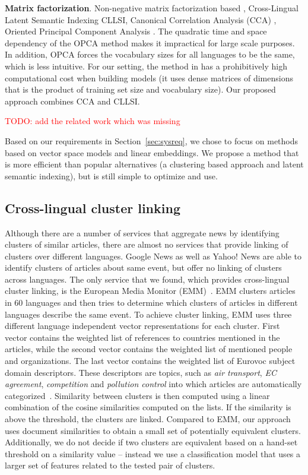 \documentclass[twoside,11pt]{article}
\newcommand{\todo}[1]{\textcolor{red}{TODO: #1}}
\begin{document}
\textbf{Matrix factorization}. Non-negative matrix factorization based \cite{nonnegfactor_lsi}, Cross-Lingual Latent Semantic Indexing CLLSI, Canonical Correlation Analysis (CCA) \cite{Hotelling}, Oriented Principal Component Analysis \cite{platt2010translingual}. The quadratic time and space dependency of the OPCA method makes it impractical for large scale purposes. In addition, OPCA forces the vocabulary sizes for all languages to be the same, which is less intuitive. For our setting, the method in \cite{nonnegfactor_lsi} has a prohibitively high computational cost when building models (it uses dense matrices of dimensions that is the product of training set size and vocabulary size). Our proposed approach combines CCA and CLLSI.

\todo{add the related work which was missing}

Based on our requirements in Section~\ref{sec:sysreq}, we chose to focus on methods based on vector space models and linear embeddings. We propose a method that is more efficient than popular alternatives (a clustering based approach and latent semantic indexing), but is still simple to optimize and use.

\subsection{Cross-lingual cluster linking}

Although there are a number of services that aggregate news by identifying clusters of similar articles, there are almost no services that provide linking of clusters over different languages. Google News as well as Yahoo! News are able to identify clusters of articles about same event, but offer no linking of clusters across languages. The only service that we found, which provides cross-lingual cluster linking, is the European Media Monitor (EMM)~\cite{pouliquen2008story,Steinberger2008}. EMM clusters articles in 60 languages and then tries to determine which clusters of articles in different languages describe the same event. To achieve cluster linking, EMM uses three different language independent vector representations for each cluster. First vector contains the weighted list of references to countries mentioned in the articles, while the second vector contains the weighted list of mentioned people and organizations. The last vector contains the weighted list of Eurovoc subject domain descriptors. These descriptors are topics, such as \emph{air transport}, \emph{EC agreement}, \emph{competition} and \emph{pollution control} into which articles are automatically categorized~. Similarity between clusters is then computed using a linear combination of the cosine similarities computed on the lists. If the similarity is above the threshold, the clusters are linked. Compared to EMM, our approach uses document similarities to obtain a small set of potentially equivalent clusters. Additionally, we do not decide if two clusters are equivalent based on a hand-set threshold on a similarity value -- instead we use a classification model that uses a larger set of features related to the tested pair of clusters.
\end{document}
